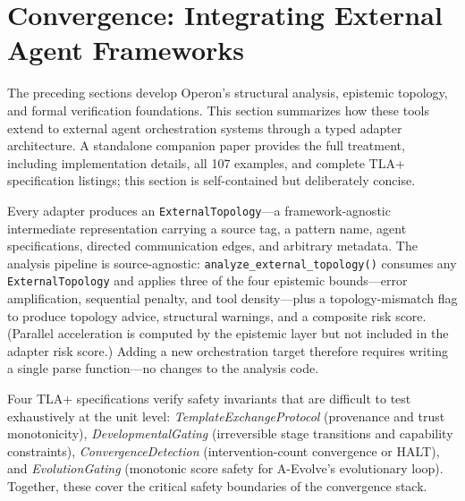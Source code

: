 \section{Convergence: Integrating External Agent Frameworks}\label{sec:convergence}

The preceding sections develop Operon's structural analysis, epistemic topology,
and formal verification foundations. This section summarizes how these tools
extend to external agent orchestration systems through a typed adapter
architecture. A standalone companion paper provides the full treatment, including
implementation details, all 107 examples, and complete TLA+ specification
listings; this section is self-contained but deliberately concise.

\begin{center}
\end{center}

Every adapter produces an \texttt{ExternalTopology}---a framework-agnostic
intermediate representation carrying a source tag, a pattern name, agent
specifications, directed communication edges, and arbitrary metadata. The
analysis pipeline is source-agnostic: \texttt{analyze\_external\_topology()}
consumes any \texttt{ExternalTopology} and applies three of the four epistemic
bounds---error amplification, sequential penalty, and tool density---plus a
topology-mismatch flag to produce topology advice, structural warnings, and
a composite risk score. (Parallel acceleration is computed by the epistemic
layer but not included in the adapter risk score.) Adding a new orchestration target therefore requires
writing a single parse function---no changes to the analysis code.

Four TLA+ specifications verify safety invariants that are difficult to test
exhaustively at the unit level: \emph{TemplateExchangeProtocol} (provenance and
trust monotonicity), \emph{DevelopmentalGating} (irreversible stage transitions
and capability constraints), \emph{ConvergenceDetection} (intervention-count
convergence or HALT), and \emph{EvolutionGating} (monotonic score safety for
A-Evolve's evolutionary loop). Together, these cover the critical safety
boundaries of the convergence stack.

